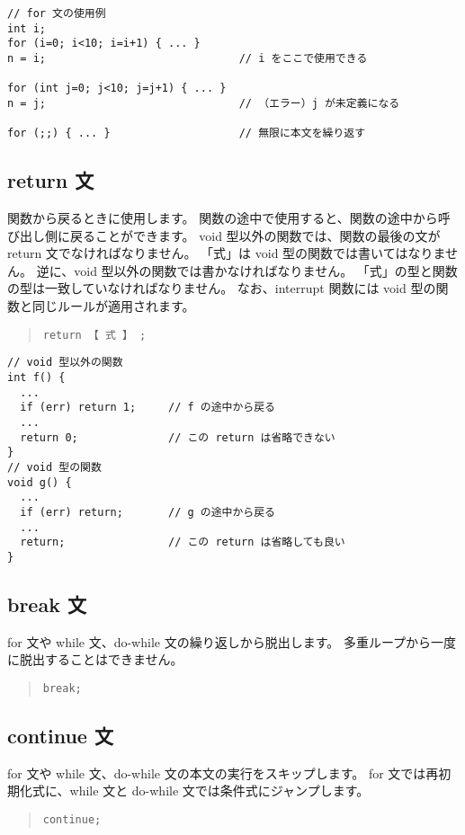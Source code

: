 \begin{mylist}
\begin{verbatim}
// for 文の使用例
int i;
for (i=0; i<10; i=i+1) { ... }
n = i;                              // i をここで使用できる

for (int j=0; j<10; j=j+1) { ... }
n = j;                              // （エラー）j が未定義になる

for (;;) { ... }                    // 無限に本文を繰り返す
\end{verbatim}
\end{mylist}

\subsection{return 文}

関数から戻るときに使用します。
関数の途中で使用すると、関数の途中から呼び出し側に戻ることができます。
void 型以外の関数では、関数の最後の文が return 文でなければなりません。
「式」は void 型の関数では書いてはなりません。
逆に、void 型以外の関数では書かなければなりません。
「式」の型と関数の型は一致していなければなりません。
なお、interrupt 関数には void 型の関数と同じルールが適用されます。

\begin{quote}
\begin{verbatim}
return 【 式 】 ;
\end{verbatim}
\end{quote}

\begin{mylist}
\begin{verbatim}
// void 型以外の関数
int f() {
  ...
  if (err) return 1;     // f の途中から戻る
  ...
  return 0;              // この return は省略できない
}
// void 型の関数
void g() {
  ...
  if (err) return;       // g の途中から戻る
  ...
  return;                // この return は省略しても良い
}
\end{verbatim}
\end{mylist}

\subsection{break 文}

for 文や while 文、do-while 文の繰り返しから脱出します。
多重ループから一度に脱出することはできません。

\begin{quote}
\begin{verbatim}
break;
\end{verbatim}
\end{quote}

\subsection{continue 文}

for 文や while 文、do-while 文の本文の実行をスキップします。
for 文では再初期化式に、while 文と do-while 文では条件式にジャンプします。

\begin{quote}
\begin{verbatim}
continue;
\end{verbatim}
\end{quote}

